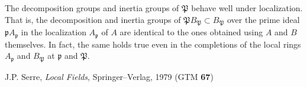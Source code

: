 \documentclass[12pt]{article}
\newcommand{\p}{{\mathfrak{p}}}
\renewcommand{\P}{{\mathfrak{P}}}
\begin{document}
The decomposition groups and inertia groups of $\P$ behave well under
localization. That is, the decomposition and inertia groups of $\P
B_\P \subset B_\P$ over the prime ideal $\p A_\p$ in the localization
$A_\p$ of $A$ are identical to the ones obtained using $A$ and $B$
themselves. In fact, the same holds true even in the completions of
the local rings $A_\p$ and $B_\P$ at $\p$ and $\P$.

\begin{thebibliography}{9}
 J.P. Serre, {\em Local Fields}, Springer--Verlag, 1979
  (GTM {\bf 67})
\end{thebibliography}
\end{document}
